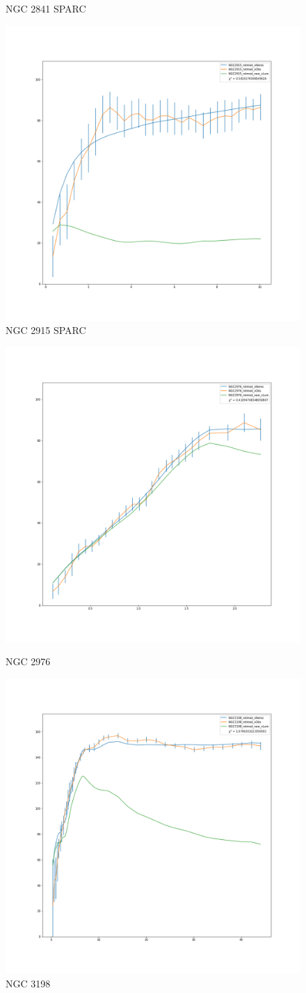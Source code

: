\documentclass[reprint,%
 amsmath,amssymb,
 aps,
]{revtex4-1}
\begin{document}
 
\begin{figure} 
\centering
\begin{minipage}{0.5\textwidth}
\caption{NGC 2841 SPARC\cite{2016Lelli}}
\label{fig:2841}
\end{minipage}
\begin{minipage}{0.5\textwidth}
\includegraphics[width=0.43\linewidth]{figures/NGC2915_rotmod_XueSofue.png}
\caption{NGC 2915 SPARC\cite{2016Lelli}}
\label{fig:2915}
\end{minipage}
\end{figure}
%
%  
\begin{figure} 
\centering
\begin{minipage}{0.5\textwidth}
\includegraphics[width=0.43\linewidth]{figures/NGC2976_rotmod_XueSofue.png}
\caption{NGC 2976}
\label{fig:2976}
\end{minipage}
\begin{minipage}{0.5\textwidth}
\includegraphics[width=0.43\linewidth]{figures/NGC3198_rotmod_XueSofue.png}
\caption{NGC 3198}
\label{fig:3198}
\end{minipage}
\end{figure}
  
 

    
     

 
\end{document}
